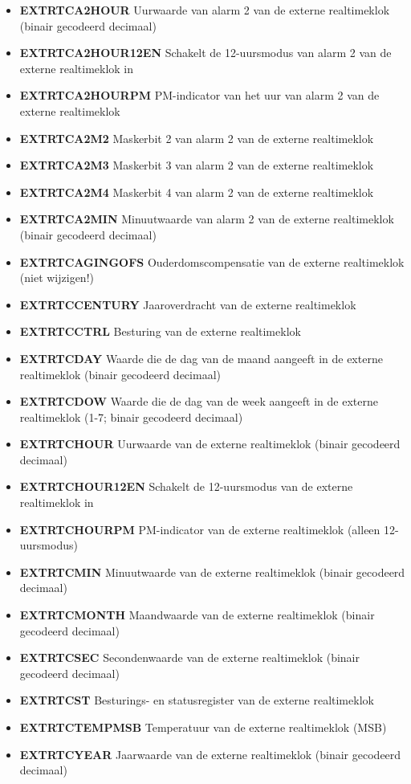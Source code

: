 \begin{itemize}
\item{\bf{EXTRTCA2HOUR}} Uurwaarde van alarm 2 van de externe realtimeklok (binair gecodeerd decimaal)
\item{\bf{EXTRTCA2HOUR12EN}} Schakelt de 12-uursmodus van alarm 2 van de externe realtimeklok in
\item{\bf{EXTRTCA2HOURPM}} PM-indicator van het uur van alarm 2 van de externe realtimeklok
\item{\bf{EXTRTCA2M2}} Maskerbit 2 van alarm 2 van de externe realtimeklok
\item{\bf{EXTRTCA2M3}} Maskerbit 3 van alarm 2 van de externe realtimeklok
\item{\bf{EXTRTCA2M4}} Maskerbit 4 van alarm 2 van de externe realtimeklok
\item{\bf{EXTRTCA2MIN}} Minuutwaarde van alarm 2 van de externe realtimeklok (binair gecodeerd decimaal)
\item{\bf{EXTRTCAGINGOFS}} Ouderdomscompensatie van de externe realtimeklok (niet wijzigen!)
\item{\bf{EXTRTCCENTURY}} Jaaroverdracht van de externe realtimeklok
\item{\bf{EXTRTCCTRL}} Besturing van de externe realtimeklok
\item{\bf{EXTRTCDAY}} Waarde die de dag van de maand aangeeft in de externe realtimeklok (binair gecodeerd decimaal)
\item{\bf{EXTRTCDOW}} Waarde die de dag van de week aangeeft in de externe realtimeklok (1-7; binair gecodeerd decimaal)
\item{\bf{EXTRTCHOUR}} Uurwaarde van de externe realtimeklok (binair gecodeerd decimaal)
\item{\bf{EXTRTCHOUR12EN}} Schakelt de 12-uursmodus van de externe realtimeklok in
\item{\bf{EXTRTCHOURPM}} PM-indicator van de externe realtimeklok (alleen 12-uursmodus)
\item{\bf{EXTRTCMIN}} Minuutwaarde van de externe realtimeklok (binair gecodeerd decimaal)
\item{\bf{EXTRTCMONTH}} Maandwaarde van de externe realtimeklok (binair gecodeerd decimaal)
\item{\bf{EXTRTCSEC}} Secondenwaarde van de externe realtimeklok (binair gecodeerd decimaal)
\item{\bf{EXTRTCST}} Besturings- en statusregister van de externe realtimeklok
\item{\bf{EXTRTCTEMPMSB}} Temperatuur van de externe realtimeklok (MSB)
\item{\bf{EXTRTCYEAR}} Jaarwaarde van de externe realtimeklok (binair gecodeerd decimaal)
\end{itemize}
